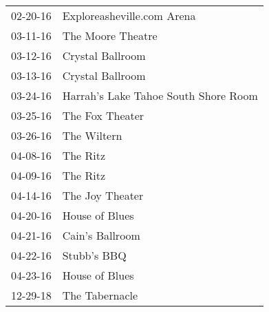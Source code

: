 \begin{supertabular}{p{0.07\textwidth}p{0.23\textwidth}}
 02-20-16 &            Exploreasheville.com Arena \\
 03-11-16 &                     The Moore Theatre \\
 03-12-16 &                      Crystal Ballroom \\
 03-13-16 &                      Crystal Ballroom \\
 03-24-16 &  Harrah’s Lake Tahoe South Shore Room \\
 03-25-16 &                       The Fox Theater \\
 03-26-16 &                           The Wiltern \\
 04-08-16 &                              The Ritz \\
 04-09-16 &                              The Ritz \\
 04-14-16 &                      The Joy  Theater \\
 04-20-16 &                        House of Blues \\
 04-21-16 &                       Cain's Ballroom \\
 04-22-16 &                           Stubb's BBQ \\
 04-23-16 &                        House of Blues \\
 12-29-18 &                        The Tabernacle \\
\end{supertabular}
